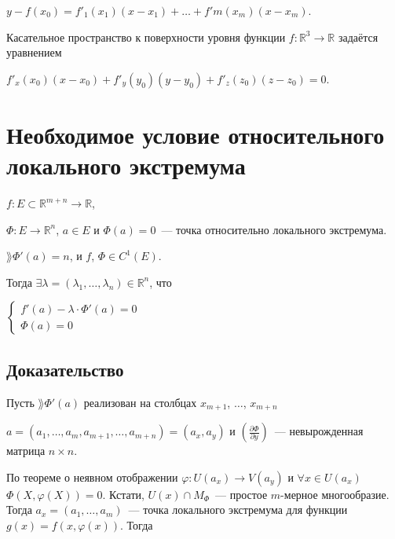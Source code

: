\documentclass{article}
\begin{document}
        $y - f(x_0) = f'_1(x_1) (x - x_1) + \ldots + f'm(x_m)(x - x_m)$.
        
        Касательное пространство к поверхности уровня функции $f : \mathbb{R}^3 \rightarrow \mathbb{R}$ задаётся уравнением
        
        $f'_x(x_0)(x - x_0) + f'_y(y_0)(y - y_0) + f'_z(z_0)(z - z_0) = 0$.
        
    \newpage
    
    \section{Необходимое условие относительного локального экстремума}
    
        $f : E \subset \mathbb{R}^{m + n} \rightarrow \mathbb{R}$,
        
        $\Phi : E \rightarrow \mathbb{R}^n$, $a \in E$ и $\Phi(a) = 0$~--- точка относительно локального экстремума.
        
        $\rang \Phi'(a) = n$, и $f$, $\Phi \in C^1 \left( E \right)$.
        
        Тогда $\exists \lambda = (\lambda_1, \ldots, \lambda_n) \in \mathbb{R}^n$, что
        
        $
            \begin{cases}
            
                f'(a) - \lambda \cdot \Phi'(a) = 0 \\
                
                \Phi(a) = 0
                
            \end{cases}
        $
        
        \subsection{Доказательство}
        
            Пусть $\rang \Phi'(a)$ реализован на столбцах $x_{m + 1}$, $\ldots$, $x_{m + n}$
            
            $a = (a_1, \ldots, a_m, a_{m + 1}, \ldots, a_{m + n}) = (a_x, a_y)$ и $\left( \frac{\partial \Phi}{\partial y} \right)$~--- невырожденная матрица $n \times n$.
            
            По теореме о неявном отображении $\varphi : U(a_x) \rightarrow V(a_y)$ и $\forall x \in U(a_x)$ $\Phi (X, \varphi(X) ) = 0$. Кстати, $U(x) \cap M_{\Phi}$~--- простое $m$-мерное многообразие. Тогда $a_x = (a_1, \ldots, a_m)$~--- точка локального экстремума для функции $g(x) = f(x, \varphi(x))$. Тогда
            
\end{document}
